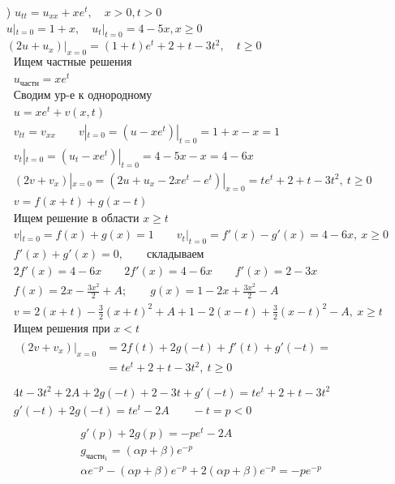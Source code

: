 \begin{enumerate}
  \item[\text{б})] $u_{tt} = u_{xx} +xe^{t}, \quad x>0,t>0$ \\
$u|_{t=0} = 1+x, \quad u_{t}|_{t=0} = 4-5x, x \geq 0$ \\
$(2u+u_{x})|_{x=0}=(1+t)e^{t}+2+t-3t^{2}, \quad t \geq 0$ \\
\begin{gather*}
  \text{Ищем частные решения} \\
  u_{\text{частн}} = xe^{t} \\
  \text{Сводим ур-е к однородному} \\
  u = xe^{t} + v(x,t) \\
  v_{tt} = v_{xx} \qquad v|_{t=0} = (u - xe^{t})|_{t=0} = 1+x-x=1 \\
  v_{t}|_{t=0}=(u_{t}-xe^{t})|_{t=0}=4-5x-x=4-6x \\
  (2v+v_{x})|_{x=0} = (2u+u_{x}-2xe^{t}-e^{t})|_{x=0} = te^{t}+2+t-3t^{2}, \ t \geq 0 \\
v = f(x+t) + g(x-t) \\
\text{Ищем решение в области $x \geq t$} \\
v|_{t=0} = f(x)+g(x) = 1 \qquad v_{t}|_{t=0} = f'(x) - g'(x) = 4 - 6x, \ x \geq 0 \\
f'(x) + g'(x) = 0, \qquad \text{складываем} \\
2f'(x)=4-6x \qquad 2f'(x) = 4-6x \qquad f'(x) = 2-3x \\
\boxed{f(x)=2x -\frac{3x^{2}}{2}+A; \qquad g(x) = 1-2x+ \frac{3x^{2}}{2}-A} \\
v = 2(x+t) - \frac{3}{2}(x+t)^{2}+A+1-2(x-t)+ \frac{3}{2}(x-t)^{2}-A, \ x \geq t \\
\text{Ищем решения при $x < t$} \\
\begin{split}
  (2v+v_{x})|_{x=0} &= 2f(t)+2g(-t)+ f'(t) + g'(-t) = \\
                    &= te^{t} +2+t -3t^{2}, \ t \geq 0 \\
\end{split} \\
4t-3t^{2}+2A+2g(-t)+2-3t+g'(-t) = te^{t}+2+t-3t^{2} \\
g'(-t)+2g(-t)=te^{t}-2A \qquad -t = p < 0 \\
\end{gather*}
\begin{gather*}
g'(p)+2g(p)=-pe^{t}-2A \\
  g_{\text{частн}_{1}} = (\alpha p + \beta ) e^{-p} \\
  \alpha e^{-p}- (\alpha p +\beta)e^{-p}+2(\alpha p + \beta)e^{-p} = -pe^{-p} \\

\end{gather*}
\end{enumerate}
